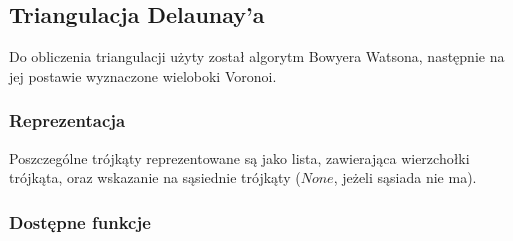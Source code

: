 \documentclass{article}
\begin{document}
\subsection{Triangulacja Delaunay'a}
Do obliczenia triangulacji użyty został algorytm Bowyera Watsona, następnie na jej postawie wyznaczone wieloboki Voronoi.

\subsubsection{Reprezentacja}
Poszczególne trójkąty reprezentowane są jako lista, zawierająca wierzchołki trójkąta, oraz wskazanie na sąsiednie trójkąty ($None$, jeżeli sąsiada nie ma).

\subsubsection{Dostępne funkcje}
\end{document}
